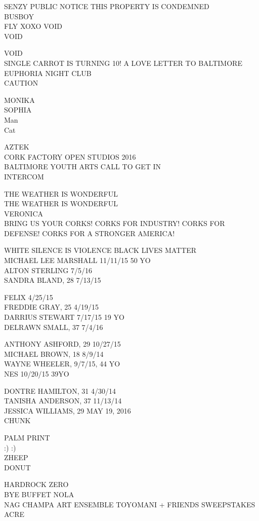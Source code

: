 \documentclass[10pt,letterpaper]{article}
\begin{document}
SENZY PUBLIC NOTICE THIS PROPERTY IS CONDEMNED\\
BUSBOY\\
FLY XOXO VOID\\
VOID

VOID\\
SINGLE CARROT IS TURNING 10! A LOVE LETTER TO BALTIMORE\\
EUPHORIA NIGHT CLUB\\
CAUTION

MONIKA\\
SOPHIA\\
Man\\
Cat

AZTEK\\
CORK FACTORY OPEN STUDIOS 2016\\
BALTIMORE YOUTH ARTS CALL TO GET IN\\
INTERCOM

THE WEATHER IS WONDERFUL\\
THE WEATHER IS WONDERFUL\\
VERONICA\\
BRING US YOUR CORKS!  CORKS FOR INDUSTRY!  CORKS FOR DEFENSE!  CORKS FOR A STRONGER AMERICA!

WHITE SILENCE IS VIOLENCE BLACK LIVES MATTER\\
MICHAEL LEE MARSHALL 11/11/15 50 YO\\
ALTON STERLING 7/5/16\\
SANDRA BLAND, 28 7/13/15

FELIX 4/25/15\\
FREDDIE GRAY, 25 4/19/15\\
DARRIUS STEWART 7/17/15 19 YO\\
DELRAWN SMALL, 37 7/4/16

ANTHONY ASHFORD, 29 10/27/15\\
MICHAEL BROWN, 18 8/9/14\\
WAYNE WHEELER, 9/7/15, 44 YO\\
NES 10/20/15 39YO

DONTRE HAMILTON, 31 4/30/14\\
TANISHA ANDERSON, 37 11/13/14\\
JESSICA WILLIAMS, 29 MAY 19, 2016\\
CHUNK

PALM PRINT\\
:) :)\\
ZHEEP\\
DONUT

HARDROCK ZERO\\
BYE BUFFET NOLA\\
NAG CHAMPA ART ENSEMBLE TOYOMANI + FRIENDS SWEEPSTAKES\\
ACRE
\end{document}
